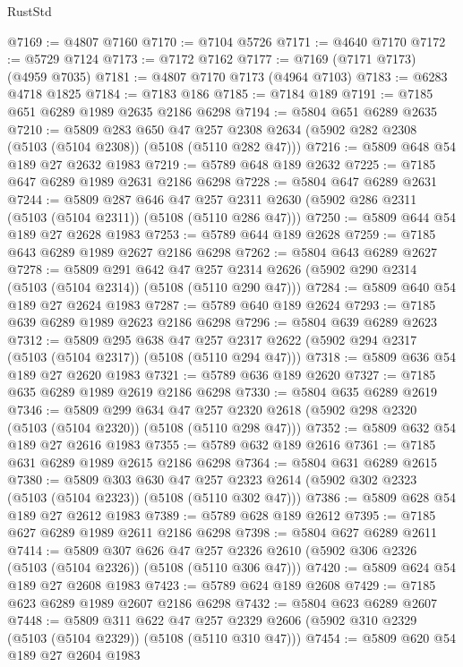\begin{lexlean}{RustStd}
\begin{coremodule}
@7169 := @4807 @7160
@7170 := @7104 @5726
@7171 := @4640 @7170
@7172 := @5729 @7124
@7173 := @7172 @7162
@7177 := @7169 (@7171 @7173) (@4959 @7035)
@7181 := @4807 @7170 @7173 (@4964 @7103)
@7183 := @6283 @4718 @1825
@7184 := @7183 @186
@7185 := @7184 @189
@7191 := @7185 @651 @6289 @1989 @2635 @2186 @6298
@7194 := @5804 @651 @6289 @2635
@7210 := @5809
    @283
    @650
    @47
    @257
    @2308
    @2634
    (@5902 @282 @2308 (@5103 (@5104 @2308)) (@5108 (@5110 @282 @47)))
@7216 := @5809 @648 @54 @189 @27 @2632 @1983
@7219 := @5789 @648 @189 @2632
@7225 := @7185 @647 @6289 @1989 @2631 @2186 @6298
@7228 := @5804 @647 @6289 @2631
@7244 := @5809
    @287
    @646
    @47
    @257
    @2311
    @2630
    (@5902 @286 @2311 (@5103 (@5104 @2311)) (@5108 (@5110 @286 @47)))
@7250 := @5809 @644 @54 @189 @27 @2628 @1983
@7253 := @5789 @644 @189 @2628
@7259 := @7185 @643 @6289 @1989 @2627 @2186 @6298
@7262 := @5804 @643 @6289 @2627
@7278 := @5809
    @291
    @642
    @47
    @257
    @2314
    @2626
    (@5902 @290 @2314 (@5103 (@5104 @2314)) (@5108 (@5110 @290 @47)))
@7284 := @5809 @640 @54 @189 @27 @2624 @1983
@7287 := @5789 @640 @189 @2624
@7293 := @7185 @639 @6289 @1989 @2623 @2186 @6298
@7296 := @5804 @639 @6289 @2623
@7312 := @5809
    @295
    @638
    @47
    @257
    @2317
    @2622
    (@5902 @294 @2317 (@5103 (@5104 @2317)) (@5108 (@5110 @294 @47)))
@7318 := @5809 @636 @54 @189 @27 @2620 @1983
@7321 := @5789 @636 @189 @2620
@7327 := @7185 @635 @6289 @1989 @2619 @2186 @6298
@7330 := @5804 @635 @6289 @2619
@7346 := @5809
    @299
    @634
    @47
    @257
    @2320
    @2618
    (@5902 @298 @2320 (@5103 (@5104 @2320)) (@5108 (@5110 @298 @47)))
@7352 := @5809 @632 @54 @189 @27 @2616 @1983
@7355 := @5789 @632 @189 @2616
@7361 := @7185 @631 @6289 @1989 @2615 @2186 @6298
@7364 := @5804 @631 @6289 @2615
@7380 := @5809
    @303
    @630
    @47
    @257
    @2323
    @2614
    (@5902 @302 @2323 (@5103 (@5104 @2323)) (@5108 (@5110 @302 @47)))
@7386 := @5809 @628 @54 @189 @27 @2612 @1983
@7389 := @5789 @628 @189 @2612
@7395 := @7185 @627 @6289 @1989 @2611 @2186 @6298
@7398 := @5804 @627 @6289 @2611
@7414 := @5809
    @307
    @626
    @47
    @257
    @2326
    @2610
    (@5902 @306 @2326 (@5103 (@5104 @2326)) (@5108 (@5110 @306 @47)))
@7420 := @5809 @624 @54 @189 @27 @2608 @1983
@7423 := @5789 @624 @189 @2608
@7429 := @7185 @623 @6289 @1989 @2607 @2186 @6298
@7432 := @5804 @623 @6289 @2607
@7448 := @5809
    @311
    @622
    @47
    @257
    @2329
    @2606
    (@5902 @310 @2329 (@5103 (@5104 @2329)) (@5108 (@5110 @310 @47)))
@7454 := @5809 @620 @54 @189 @27 @2604 @1983

\end{coremodule}
\end{lexlean}
